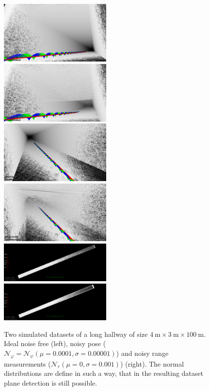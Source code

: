 \begin{figure}
	\centering
	\includegraphics[width=0.495\textwidth]{images/perfect_bottom}\hfill
	\includegraphics[width=0.495\textwidth]{images/noisy_pose_and_range_bottom}\\
	\includegraphics[width=0.495\textwidth]{images/perfect_top}\hfill
	\includegraphics[width=0.495\textwidth]{images/noisy_pose_and_range_top}\\
	\includegraphics[width=0.495\textwidth]{images/perfect_top_view}\hfill
	\includegraphics[width=0.495\textwidth, height=0.1825\textwidth]{images/noisy_pose_and_range_top_view}
	\caption{Two simulated datasets of a long hallway of size $\SI{4}{\meter}\times\SI{3}{\meter}\times\SI{100}{\meter}$. Ideal noise free (left), noisy pose ($\mathcal{N}_\varphi = \mathcal{N}_\psi(\mu = 0.0001, \sigma= 0.00001)$) and noisy range measurements ($\mathcal{N}_r(\mu = 0, \sigma = 0.001)$) (right). 
	The normal distributions are define in such a way, that in the resulting dataset plane detection is still possible.}
	\label{fig:simulatedDatasets}
\end{figure}

